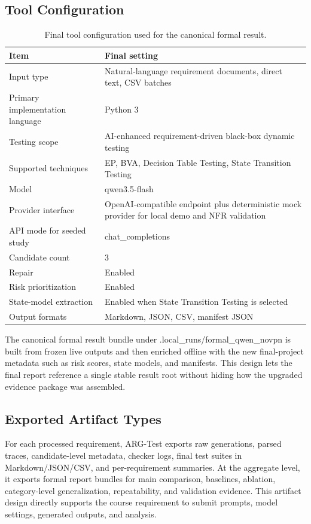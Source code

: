 \documentclass{article}
\renewcommand{\texttt}[1]{{\normalfont #1}}
\begin{document}
\subsection{Tool Configuration}
\begin{table}[h]
\centering
\small
\caption{Final tool configuration used for the canonical formal result.}
\label{tab:toolconfig}
\begin{tabular}{p{} p{}}
\toprule
\textbf{Item} & \textbf{Final setting} \\
\midrule
Input type & Natural-language requirement documents, direct text, CSV batches \\
Primary implementation language & Python 3 \\
Testing scope & AI-enhanced requirement-driven black-box dynamic testing \\
Supported techniques & EP, BVA, Decision Table Testing, State Transition Testing \\
Model & \texttt{qwen3.5-flash} \\
Provider interface & OpenAI-compatible endpoint plus deterministic mock provider for local demo and NFR validation \\
API mode for seeded study & \texttt{chat\_completions} \\
Candidate count & 3 \\
Repair & Enabled \\
Risk prioritization & Enabled \\
State-model extraction & Enabled when State Transition Testing is selected \\
Output formats & Markdown, JSON, CSV, manifest JSON \\
\bottomrule
\end{tabular}
\end{table}

The canonical formal result bundle under \texttt{.local\_runs/formal\_qwen\_novpn} is built from frozen live outputs and then enriched offline with the new final-project metadata such as risk scores, state models, and manifests. This design lets the final report reference a single stable result root without hiding how the upgraded evidence package was assembled.

\subsection{Exported Artifact Types}
For each processed requirement, ARG-Test exports raw generations, parsed traces, candidate-level metadata, checker logs, final test suites in Markdown/JSON/CSV, and per-requirement summaries. At the aggregate level, it exports formal report bundles for main comparison, baselines, ablation, category-level generalization, repeatability, and validation evidence. This artifact design directly supports the course requirement to submit prompts, model settings, generated outputs, and analysis.
\end{document}
